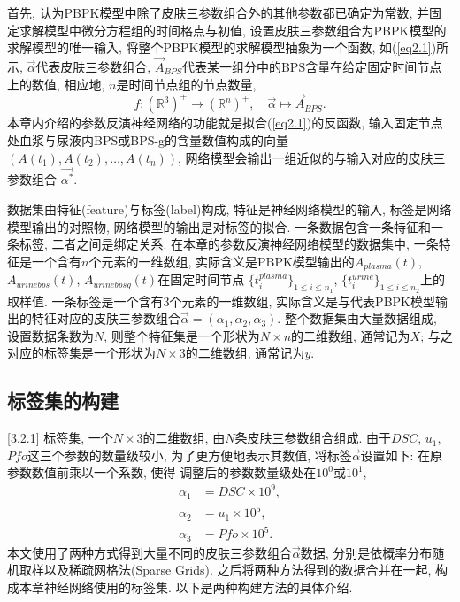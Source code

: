 \documentclass[a4paper,punct=banjiao,twoside]{ctexrep}
\theoremstyle{plain}
\theoremstyle{definition}
\theoremstyle{remark}
\begin{document}
首先, 认为PBPK模型中除了皮肤三参数组合外的其他参数都已确定为常数, 并固定求解模型中微分方程组的时间格点与初值, 设置皮肤三参数组合为PBPK模型的求解模型的唯一输入, 
将整个PBPK模型的求解模型抽象为一个函数, 如(\ref{eq2.1})所示,  $\vec{\alpha}$代表皮肤三参数组合, $\vec{A}_{BPS}$代表某一组分中的BPS含量在给定固定时间节点上的数值, 相应地, $n$是时间节点组的节点数量,
\begin{equation}\label{eq2.1}
f:(\mathbb{R}^3)^{+} \to (\mathbb{R}^n)^{+},\quad \vec{\alpha}\mapsto \vec{A}_{BPS}.
\end{equation}
\noindent 本章内介绍的参数反演神经网络的功能就是拟合(\ref{eq2.1})的反函数, 输入固定节点处血浆与尿液内BPS或BPS-g的含量数值构成的向量$(A(t_1),A(t_2),\dots,A(t_n))$, 网络模型会输出一组近似的与输入对应的皮肤三参数组合
$\vec{\alpha^*}$.

数据集由特征(feature)与标签(label)构成, 特征是神经网络模型的输入, 标签是网络模型输出的对照物, 网络模型的输出是对标签的拟合. 一条数据包含一条特征和一条标签, 二者之间是绑定关系. 
在本章的参数反演神经网络模型的数据集中, 一条特征是一个含有$n$个元素的一维数组, 实际含义是PBPK模型输出的$A_{plasma}(t)$, $A_{urinebps}(t)$, $A_{urinebpsg}(t)$在固定时间节点
$\{t^{plasma}_{i}\}_{1 \leq i \leq n_1}$, $\{t^{urine}_{i}\}_{1 \leq i \leq n_2}$上的取样值. 一条标签是一个含有$3$个元素的一维数组, 实际含义是与代表PBPK模型输出的特征对应的皮肤三参数组合$\vec{\alpha} = (\alpha_1,\alpha_2,\alpha_3)$. 
整个数据集由大量数据组成, 设置数据条数为$N$, 则整个特征集是一个形状为$N \times n$的二维数组, 通常记为$X$; 与之对应的标签集是一个形状为$N \times 3$的二维数组, 通常记为$y$. 

\subsection{标签集的构建}
\ref{3.2.1}
标签集, 一个$N \times 3$的二维数组, 由$N$条皮肤三参数组合组成. 由于$DSC$, $u_1$, $Pfo$这三个参数的数量级较小, 为了更方便地表示其数值, 将标签$\vec{\alpha}$设置如下: 在原参数数值前乘以一个系数, 使得
调整后的参数数量级处在$10^0$或$10^1$,
\begin{align*}
  \alpha_1 &= DSC \times 10^9, \\
  \alpha_2 &=u_1 \times 10^5,\\
  \alpha_3 &= Pfo \times 10^5.
\end{align*}
\noindent 本文使用了两种方式得到大量不同的皮肤三参数组合$\vec{\alpha}$数据, 分别是依概率分布随机取样以及稀疏网格法(Sparse Grids). 之后将两种方法得到的数据合并在一起, 构成本章神经网络使用的标签集.
以下是两种构建方法的具体介绍.
\end{document}
